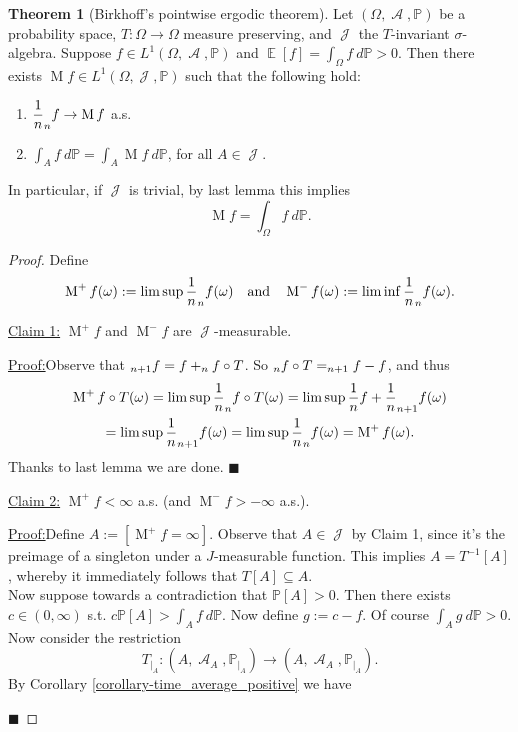 \documentclass[12pt,a4paper]{report}
\theoremstyle{definition}
\newtheorem{theorem}{Theorem}[chapter] %
\theoremstyle{num.custom-title}
\newenvironment{claim}[1]{\par\noindent\underline{Claim#1:}\space}{} %
\newenvironment{claimproof}[1]{\par\noindent\underline{Proof:}\space#1}{\leavevmode\unskip\penalty9999 \hbox{}\nobreak\hfill\quad\hbox{$\blacksquare$}} %
\DeclareMathOperator{\A}{\mathcal{A}}
\DeclareMathOperator{\E}{\mathbb{E}}
\DeclareMathOperator{\J}{\mathcal{J}}
\DeclareMathOperator{\sse}{\subseteq}
\let\S\relax %
\DeclareMathOperator{\S}{S}
\newcommand{\M}{\mathcal{M}}
\renewcommand{\1}{\mathbbm{1}}
\renewcommand{\P}{\mathbb{P}}
\begin{document}
\begin{theorem}[Birkhoff's pointwise ergodic theorem]
\renewcommand{\M}{\operatorname{M}}
Let $(\Omega,\A,\P)$ be a probability space, $T \colon \Omega \to \Omega$ measure preserving, and $\J$ the $T$-invariant $\sigma$-algebra. Suppose $f \in L^1(\Omega,\A,\P)$ and $\E[f] = \int_\Omega f \ d\P > 0$. Then there exists $\M f \in L^1(\Omega,\J,\P)$ such that the following hold:
\begin{enumerate}
\item $\displaystyle \frac{1}{n} \S_n f \to \M f$ a.s.
\item $\displaystyle \int_A f \ d\P = \int_A \M f \ d\P$, for all $A \in \J$.
\end{enumerate}
In particular, if $\J$ is trivial, by last lemma this implies
\[
\M f = \int_\Omega f \ d\P.
\]
\begin{proof}
Define 
\[
\M^+ f(\omega) := \limsup \frac{1}{n} \S_n f(\omega) \quad \text{and} \quad \M^- f(\omega) := \liminf \frac{1}{n} \S_n f(\omega).
\]
\begin{claim}{ 1}
$\M^+ f$ and $\M^- f$ are $\J$-measurable.
\begin{claimproof}
Observe that $\S_{n+1} f = f + \S_n f \circ T$. So $\S_n f \circ T = \S_{n+1} f -f$, and thus
\begin{multline*}
\M^+ f \circ T (\omega) = \limsup \frac{1}{n} \S_n f \circ T (\omega) = \limsup \frac{1}{n} f + \frac{1}{n} \S_{n+1} f (\omega) \\
= \limsup \frac{1}{n} \S_{n+1} f (\omega) = \limsup \frac{1}{n} \S_n f (\omega) = \M^+ f(\omega).
\end{multline*}
Thanks to last lemma we are done.
\end{claimproof}
\end{claim}\\
\begin{claim}{ 2}
$\M^+ f < \infty$ a.s. (and $\M^- f > -\infty$ a.s.).
\begin{claimproof}
Define $A := [\M^+ f = \infty]$. Observe that $A \in \J$ by Claim 1, since it's the preimage of a singleton under a $J$-measurable function. This implies $A=T^{-1}[A]$, whereby it immediately follows that $T[A] \sse A$.\\
Now suppose towards a contradiction that $\P[A]>0$. Then there exists $c \in (0,\infty)$ s.t. $c\P[A] > \int_A f \ d\P$. Now define $g := c-f$. Of course $\int_A g \ d\P > 0$. Now consider the restriction
\[
T_{|_A} \colon (A,\A_A,\P_{|_A}) \to (A,\A_A,\P_{|_A}).
\]
By Corollary \ref{corollary-time_average_positive} we have

\end{claimproof}
\end{claim}
\end{proof}
\end{theorem}
\end{document}
